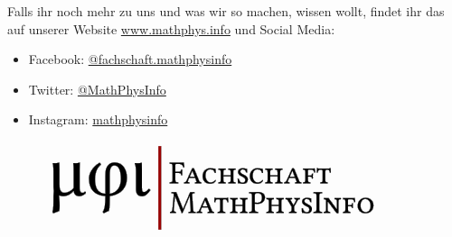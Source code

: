 Falls ihr noch mehr zu uns und was wir so machen, wissen wollt, findet ihr das auf unserer Website \url{www.mathphys.info} und Social Media: 
\begin{itemize}
\item[\faFacebookSquare] Facebook: \href{https://www.facebook.com/fachschaft.mathphysinfo}{@fachschaft.mathphysinfo}
\item[\faTwitterSquare] Twitter: \href{https://twitter.com/MathPhysInfo}{@MathPhysInfo}
\item[\faInstagram] Instagram: \href{https://www.instagram.com/mathphysinfo/}{mathphysinfo}
\end{itemize}
\begin{figure}[h]
\centering
\includegraphics[width=0.5\linewidth]{media/mathphysinfologo}
\end{figure}